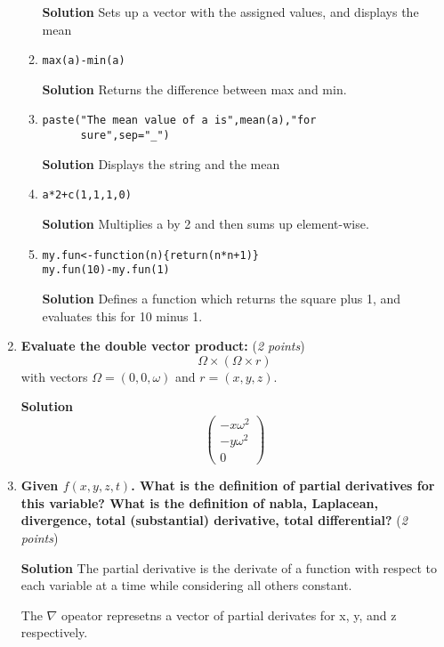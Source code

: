 \documentclass[a4paper,12pt]{article}
\begin{document}
\begin{enumerate}
\begin{enumerate}
\textbf{Solution} Sets up a vector with the assigned values, and
displays the mean

\item
      \begin{verbatim}max(a)-min(a) \end{verbatim} 
\textbf{Solution} Returns the difference between max and min.
\item
      \begin{verbatim}paste("The mean value of a is",mean(a),"for
      sure",sep="_") \end{verbatim}

\textbf{Solution} Displays the string and the mean

\item
      \begin{verbatim}a*2+c(1,1,1,0)\end{verbatim} 
\textbf{Solution} Multiplies a by 2 and then sums up element-wise.
\item
      \begin{verbatim}
my.fun<-function(n){return(n*n+1)}
my.fun(10)-my.fun(1)\end{verbatim}

\textbf{Solution} Defines a function which returns the square plus 1,
and evaluates this for 10 minus 1. 
\end{enumerate}
\vspace{1cm}

  \item \textbf{Evaluate the double vector product:} (\textit{2 points})
$$ \Omega \times ( \Omega \times r ) $$
with vectors $\Omega=(0,0,\omega)$ and $r=(x,y,z)$.

\textbf{Solution}
$$
\left( 
\begin{array}{c}
 -x\omega^{2} \\
 -y\omega^{2} \\
 0
 \end{array}
\right)
$$

  \item \textbf{Given $f(x,y,z,t)$. What is the definition of partial derivatives for this variable?
What is the definition of nabla, Laplacean, divergence, total (substantial) derivative, total differential?} (\textit{2 points})

\textbf{Solution} The partial derivative is the derivate of a function
with respect to each variable at a time while considering all others
constant.

The $\nabla$ opeator represetns a vector of partial derivates for x,
y, and z respectively.


\end{enumerate}
\end{document}
